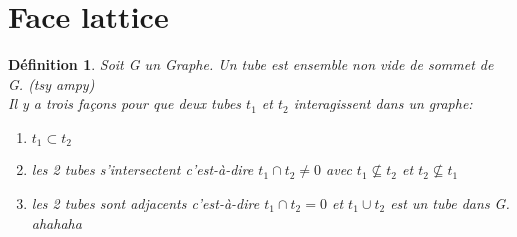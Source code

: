 \documentclass{book}
\newtheorem{petit_nom2}{Définition}[chapter]
\begin{document}
\section{Face lattice}
\begin{petit_nom2}
Soit G un Graphe. Un \textit{tube} est ensemble non vide de sommet de G. (tsy ampy)\\
Il y a trois façons pour que deux tubes $t_1$ et $t_2$ interagissent dans un graphe:
\begin{enumerate}
\item $t_1 \subset t_2$
\item les 2 tubes s'intersectent c'est-à-dire $t_1 \cap t_2 \neq 0$ avec $ t_1 \nsubseteq t_2$ et $t_2 \nsubseteq t_1 $
\item les 2 tubes sont adjacents c'est-à-dire $t_1 \cap t_2 = 0$ et $t_1 \cup t_2$ est un tube dans G. ahahaha
\end{enumerate}
\end{petit_nom2}
\end{document}
